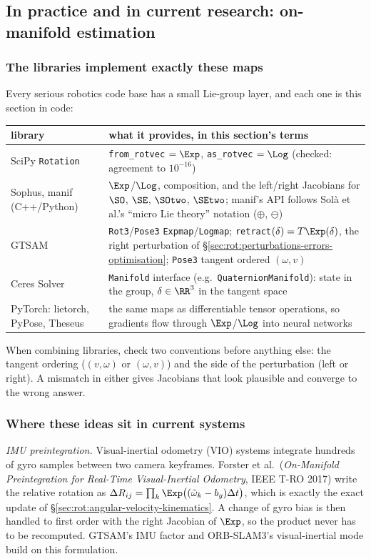 \subsection{In practice and in current research: on-manifold estimation}\label{sec:rot:exp-in-practice}

\subsubsection{The libraries implement exactly these maps}
Every serious robotics code base has a small Lie-group layer, and each one is this section in code:
\begin{center}\small
\renewcommand{\arraystretch}{1.15}
\begin{tabularx}{\linewidth}{@{}l>{\raggedright\arraybackslash}X@{}}\toprule
library & what it provides, in this section's terms\\\midrule
SciPy \texttt{Rotation} & \texttt{from\_rotvec} $=\Exp$, \texttt{as\_rotvec} $=\Log$ (checked: agreement to $10^{-16}$)\\
Sophus, manif (C++/Python) & $\Exp$/$\Log$, composition, and the left/right Jacobians for $\SO$, $\SE$, $\SOtwo$, $\SEtwo$; manif's API follows Solà et al.'s ``micro Lie theory'' notation ($\oplus$, $\ominus$)\\
GTSAM & \texttt{Rot3}/\texttt{Pose3} \texttt{Expmap}/\texttt{Logmap}; \texttt{retract}$(\delta)=T\Exp(\delta)$, the right perturbation of \S\ref{sec:rot:perturbations-errors-optimisation}; \texttt{Pose3} tangent ordered $(\omega,v)$\\
Ceres Solver & \texttt{Manifold} interface (e.g.\ \texttt{QuaternionManifold}): state in the group, $\delta\in\RR^3$ in the tangent space\\
PyTorch: lietorch, PyPose, Theseus & the same maps as differentiable tensor operations, so gradients flow through $\Exp$/$\Log$ into neural networks\\\bottomrule
\end{tabularx}
\end{center}
When combining libraries, check two conventions before anything else: the tangent ordering ($(v,\omega)$ or $(\omega,v)$) and the side of the perturbation (left or right). A mismatch in either gives Jacobians that look plausible and converge to the wrong answer.

\subsubsection{Where these ideas sit in current systems}
\emph{IMU preintegration.} Visual-inertial odometry (VIO) systems integrate hundreds of gyro samples between two camera keyframes. Forster et al.\ (\emph{On-Manifold Preintegration for Real-Time Visual-Inertial Odometry}, IEEE T-RO 2017) write the relative rotation as $\Delta R_{ij}=\prod_k\Exp\big((\tilde\omega_k-b_g)\Delta t\big)$, which is exactly the exact update of \S\ref{sec:rot:angular-velocity-kinematics}. A change of gyro bias is then handled to first order with the right Jacobian of $\Exp$, so the product never has to be recomputed. GTSAM's IMU factor and ORB-SLAM3's visual-inertial mode build on this formulation.

